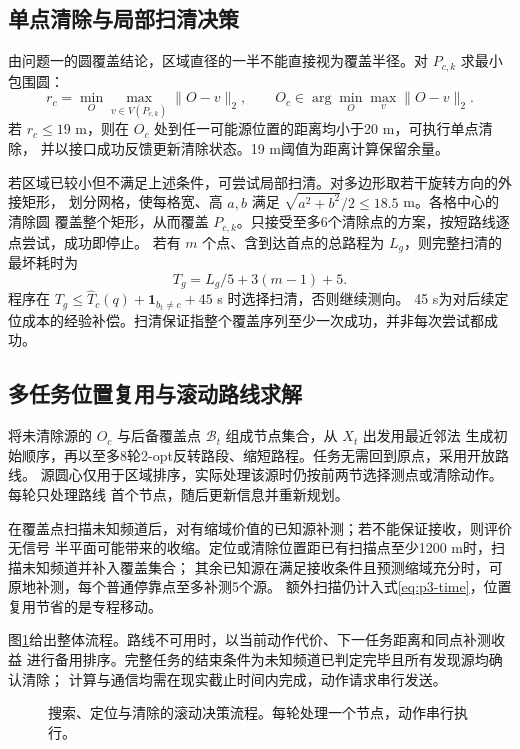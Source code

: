 \subsection{单点清除与局部扫清决策}

由问题一的圆覆盖结论，区域直径的一半不能直接视为覆盖半径。对 $P_{c,k}$ 求最小包围圆：
\begin{equation}\label{eq:p3-mec}
r_c=\min_O\max_{v\in V(P_{c,k})}\|O-v\|_2,\qquad O_c\in\arg\min_O\max_v\|O-v\|_2.
\end{equation}
若 $r_c\le19$ m，则在 $O_c$ 处到任一可能源位置的距离均小于20 m，可执行单点清除，
并以接口成功反馈更新清除状态。19 m阈值为距离计算保留余量。

若区域已较小但不满足上述条件，可尝试局部扫清。对多边形取若干旋转方向的外接矩形，
划分网格，使每格宽、高 $a,b$ 满足 $\sqrt{a^2+b^2}/2\le18.5$ m。各格中心的清除圆
覆盖整个矩形，从而覆盖 $P_{c,k}$。只接受至多6个清除点的方案，按短路线逐点尝试，成功即停止。
若有 $m$ 个点、含到达首点的总路程为 $L_g$，则完整扫清的最坏耗时为
\begin{equation}\label{eq:p3-sweep}
T_g=L_g/5+3(m-1)+5.
\end{equation}
程序在 $T_g\le\widehat T_c(q)+\mathbf1_{b_t\ne c}+45$ s 时选择扫清，否则继续测向。
45 s为对后续定位成本的经验补偿。扫清保证指整个覆盖序列至少一次成功，并非每次尝试都成功。

\subsection{多任务位置复用与滚动路线求解}

将未清除源的 $O_c$ 与后备覆盖点 $\mathcal B_t$ 组成节点集合，从 $X_t$ 出发用最近邻法
生成初始顺序，再以至多8轮2-opt反转路段、缩短路程。任务无需回到原点，采用开放路线。
源圆心仅用于区域排序，实际处理该源时仍按前两节选择测点或清除动作。每轮只处理路线
首个节点，随后更新信息并重新规划。

在覆盖点扫描未知频道后，对有缩域价值的已知源补测；若不能保证接收，则评价无信号
半平面可能带来的收缩。定位或清除位置距已有扫描点至少1200 m时，扫描未知频道并补入覆盖集合；
其余已知源在满足接收条件且预测缩域充分时，可原地补测，每个普通停靠点至多补测5个源。
额外扫描仍计入式\eqref{eq:p3-time}，位置复用节省的是专程移动。

图\ref{fig:p3-flow}给出整体流程。路线不可用时，以当前动作代价、下一任务距离和同点补测收益
进行备用排序。完整任务的结束条件为未知频道已判定完毕且所有发现源均确认清除；
计算与通信均需在现实截止时间内完成，动作请求串行发送。

\begin{figure}[H]
\centering

\caption{搜索、定位与清除的滚动决策流程。每轮处理一个节点，动作串行执行。}
\label{fig:p3-flow}
\end{figure}

